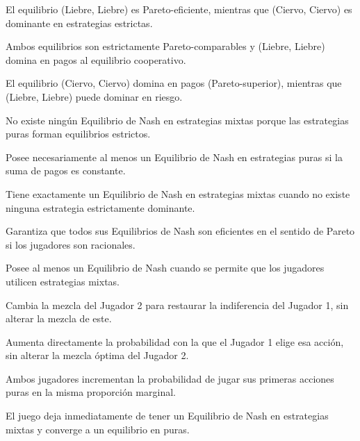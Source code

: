 \begin{opts}
    \item El equilibrio (Liebre, Liebre) es Pareto-eficiente, mientras que (Ciervo, Ciervo) es dominante en estrategias estrictas.
    \item Ambos equilibrios son estrictamente Pareto-comparables y (Liebre, Liebre) domina en pagos al equilibrio cooperativo.
    \item El equilibrio (Ciervo, Ciervo) domina en pagos (Pareto-superior), mientras que (Liebre, Liebre) puede dominar en riesgo.
    \item No existe ningún Equilibrio de Nash en estrategias mixtas porque las estrategias puras forman equilibrios estrictos.
\end{opts}

\begin{opts}
    \item Posee necesariamente al menos un Equilibrio de Nash en estrategias puras si la suma de pagos es constante.
    \item Tiene exactamente un Equilibrio de Nash en estrategias mixtas cuando no existe ninguna estrategia estrictamente dominante.
    \item Garantiza que todos sus Equilibrios de Nash son eficientes en el sentido de Pareto si los jugadores son racionales.
    \item Posee al menos un Equilibrio de Nash cuando se permite que los jugadores utilicen estrategias mixtas.
\end{opts}

\begin{opts}
    \item Cambia la mezcla del Jugador 2 para restaurar la indiferencia del Jugador 1, sin alterar la mezcla de este.
    \item Aumenta directamente la probabilidad con la que el Jugador 1 elige esa acción, sin alterar la mezcla óptima del Jugador 2.
    \item Ambos jugadores incrementan la probabilidad de jugar sus primeras acciones puras en la misma proporción marginal.
    \item El juego deja inmediatamente de tener un Equilibrio de Nash en estrategias mixtas y converge a un equilibrio en puras.
\end{opts}

